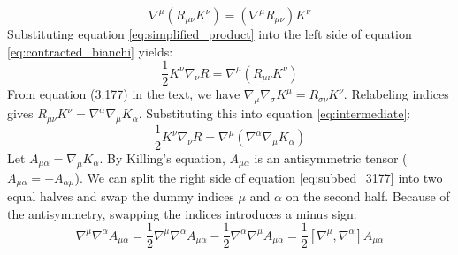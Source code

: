 \documentclass[11pt, a4paper]{report}
\begin{document}
\begin{equation} \nabla^\mu (R_{\mu\nu} K^\nu) = (\nabla^\mu R_{\mu\nu}) K^\nu \label{eq:simplified_product} \end{equation}
Substituting equation \eqref{eq:simplified_product} into the left side of equation \eqref{eq:contracted_bianchi} yields:
\begin{equation} \frac{1}{2} K^\nu \nabla_\nu R = \nabla^\mu (R_{\mu\nu} K^\nu) \label{eq:intermediate} \end{equation}
From equation (3.177) in the text, we have $\nabla_\mu \nabla_\sigma K^\mu = R_{\sigma\nu} K^\nu$. Relabeling indices gives $R_{\mu\nu} K^\nu = \nabla^\alpha \nabla_\mu K_\alpha$. Substituting this into equation \eqref{eq:intermediate}:
\begin{equation} \frac{1}{2} K^\nu \nabla_\nu R = \nabla^\mu (\nabla^\alpha \nabla_\mu K_\alpha) \label{eq:subbed_3177} \end{equation}
Let $A_{\mu\alpha} = \nabla_\mu K_\alpha$. By Killing's equation, $A_{\mu\alpha}$ is an antisymmetric tensor ($A_{\mu\alpha} = -A_{\alpha\mu}$). We can split the right side of equation \eqref{eq:subbed_3177} into two equal halves and swap the dummy indices $\mu$ and $\alpha$ on the second half. Because of the antisymmetry, swapping the indices introduces a minus sign:
\begin{equation} \nabla^\mu \nabla^\alpha A_{\mu\alpha} = \frac{1}{2} \nabla^\mu \nabla^\alpha A_{\mu\alpha} - \frac{1}{2} \nabla^\alpha \nabla^\mu A_{\mu\alpha} = \frac{1}{2} [\nabla^\mu, \nabla^\alpha] A_{\mu\alpha} \label{eq:commutator} \end{equation}
\end{document}
